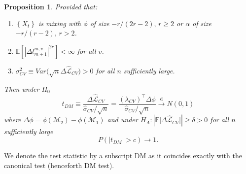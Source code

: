 \documentclass[11pt,dvipsnames]{article}
\newtheorem{proposition}{Proposition}
\begin{document}
\begin{proposition} \label{prop:PropositionDM}
Provided that:
\begin{enumerate}[label=(\roman*)]
\item $ \left\lbrace X_{t} \right\rbrace  $ is mixing with $ \phi $ of size $ -r/(2r-2),\,r \geq 2 $ or $ \alpha $ of size $ -r/(r-2),\,r>2 $.
\item $ \mathbb{E}\left[ | \Delta l_{m+1}^{m,v} |^{2r}\right] < \infty $ for all $ v $.
\item $ \sigma_{CV}^{2} \equiv Var\big( \sqrt{n} \Delta \widehat{\mathcal{L}}_{CV} \big) >0 $ for all $ n $ sufficiently large.
\end{enumerate}
Then under $ H_{0} $ 
\begin{equation}\label{eq:tDM} 
t_{DM} \equiv \dfrac{\Delta \widehat{\mathcal{L}}_{CV}}{\widehat{\sigma}_{CV}/\sqrt{n}} =
 \dfrac{(\lambda_{CV})^{\top} \Delta\phi}{\widehat{\sigma}_{CV}/\sqrt{n}} \overset{\mathrm{d}}{\longrightarrow} N(0,1)
\end{equation}
where $ \Delta\phi=\phi(\mathcal{M}_{2})-\phi(\mathcal{M}_{1}) $ and under $ H_{A}:|\mathbb{E}\big[ \Delta \widehat{\mathcal{L}}_{CV} \big] |\geq \delta > 0 $ for all $ n $ sufficiently large
\begin{equation}
P\left( |t_{DM}|>c\right) \longrightarrow 1.
\end{equation} 
\end{proposition}
We denote the test statistic by a subscript DM as it coincides exactly with the canonical \citet{dieboldComparingPredictiveAccuracy1995} test (henceforth DM test). 
\end{document}
